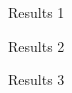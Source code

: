 \begin{frame}{Results 1}
    
    \label{results-1}


\end{frame}



\begin{frame}{Results 2}
    
    \label{results-2}


\end{frame}


\begin{frame}{Results 3}
    
    \label{results-3}


\end{frame}